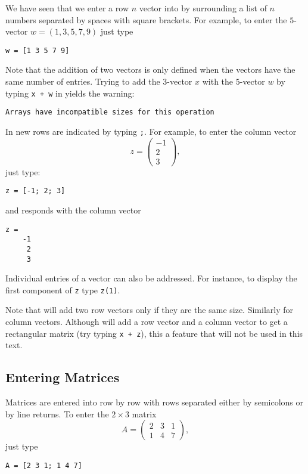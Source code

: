 \documentclass{ximera}
\begin{document}
We have seen that we enter a row $n$ vector into \Matlab by
surrounding a list of $n$ numbers separated by spaces with
square brackets.  For example, to enter the $5$-vector
$w=(1,3,5,7,9)$ just type
\begin{verbatim}
w = [1 3 5 7 9]
\end{verbatim}
Note that the addition of two vectors is only defined when the
vectors have the same number of entries.  Trying to add the
$3$-vector $x$ with the $5$-vector $w$ by typing {\tt x + w} in \Matlab
yields the warning:
{\small
\begin{verbatim}
Arrays have incompatible sizes for this operation
\end{verbatim}
}

In \Matlab new rows are indicated by typing {\tt ;}. For
example, to enter the column vector
\[
z=\left(\begin{array}{r} -1 \\ 2\\ 3 \end{array}\right),
\]
just type:
\begin{verbatim}
z = [-1; 2; 3]
\end{verbatim}
\index{\computer![1; 2; 3]} and \Matlab responds with the column vector 
\begin{verbatim}
z =
    -1
     2
     3
\end{verbatim}
Individual entries of a vector can also be addressed.  For instance,
to display the first component of {\tt z} type {\tt z(1)}.

Note that \Matlab will add two row vectors only if they are the same size.  
Similarly for column vectors. Although \Matlab will add a row vector and 
a column vector to get a rectangular matrix (try typing {\tt x + z}), this a 
feature that will not be used in this text.

\subsection*{Entering Matrices}

Matrices are entered into \Matlab row by row with
rows separated either by semicolons or by line returns.  To enter
the $2\times 3$ matrix
\[
A=\left(\begin{array}{ccc} 2 & 3 & 1 \\ 1 & 4 & 7
\end{array}\right),
\]
just type
\begin{verbatim}
A = [2 3 1; 1 4 7]
\end{verbatim}
\end{document}
